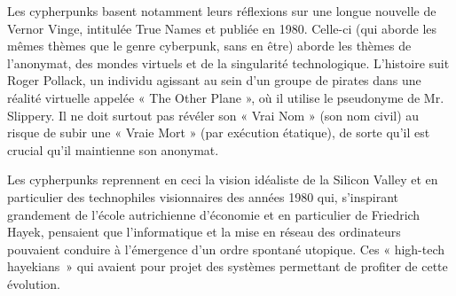 Les cypherpunks basent notamment leurs réflexions sur une longue nouvelle de Vernor Vinge, intitulée True Names et publiée en 1980. Celle-ci (qui aborde les mêmes thèmes que le genre cyberpunk, sans en être) aborde les thèmes de l'anonymat, des mondes virtuels et de la singularité technologique. L'histoire suit Roger Pollack, un individu agissant au sein d'un groupe de pirates dans une réalité virtuelle appelée « The Other Plane », où il utilise le pseudonyme de Mr. Slippery. Il ne doit surtout pas révéler son « Vrai Nom » (son nom civil) au risque de subir une « Vraie Mort » (par exécution étatique), de sorte qu'il est crucial qu'il maintienne son anonymat. %

Les cypherpunks reprennent en ceci la vision idéaliste de la Silicon Valley et en particulier des technophiles visionnaires des années 1980 qui, s'inspirant grandement de l'école autrichienne d'économie et en particulier de Friedrich Hayek, pensaient que l'informatique et la mise en réseau des ordinateurs pouvaient conduire à l'émergence d'un ordre spontané utopique. Ces « high-tech hayekians~» qui avaient pour projet des systèmes permettant de profiter de cette évolution.

